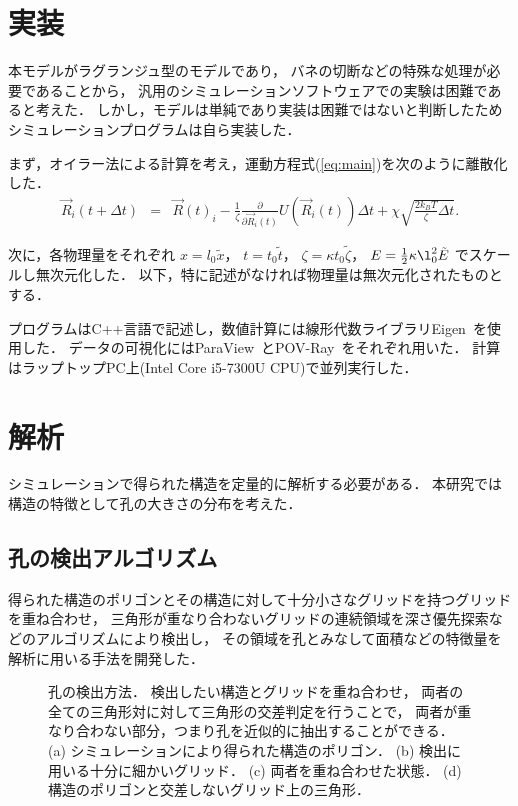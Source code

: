 


\section{実装}
本モデルがラグランジュ型のモデルであり，
バネの切断などの特殊な処理が必要であることから，
汎用のシミュレーションソフトウェアでの実験は困難であると考えた．
しかし，モデルは単純であり実装は困難ではないと判断したためシミュレーションプログラムは自ら実装した．

まず，オイラー法による計算を考え，運動方程式(\ref{eq:main})を次のように離散化した．
\begin{eqnarray}
    \vec{R}_i(t+\Delta t) &=& 
    \vec{R}(t)_i
    -\frac{1}{\zeta}\frac{\partial}{\partial\vec{R}_i(t)}U(\vec{R}_i(t))\Delta t
    +\chi\sqrt{\frac{2k_B T}{\zeta}\Delta t}
    .
\end{eqnarray}

次に，各物理量をそれぞれ
$x=l_0 \tilde{x}$，
$t=t_0 \tilde{t}$，
$\zeta=\kappa t_0 \tilde{\zeta}$，
$E=\frac{1}{2}\kappa\l_0^2\tilde{E}$
でスケールし無次元化した．
以下，特に記述がなければ物理量は無次元化されたものとする．


プログラムはC++言語で記述し，数値計算には線形代数ライブラリEigen~\cite{eigenweb}を使用した．
データの可視化にはParaView~\cite{paraview}とPOV-Ray~\cite{povray}をそれぞれ用いた．
計算はラップトップPC上(Intel Core i5-7300U CPU)で並列実行した．


\section{解析}
シミュレーションで得られた構造を定量的に解析する必要がある．
本研究では構造の特徴として孔の大きさの分布を考えた．

\subsection{孔の検出アルゴリズム}

得られた構造のポリゴンとその構造に対して十分小さなグリッドを持つグリッドを重ね合わせ，
三角形が重なり合わないグリッドの連続領域を深さ優先探索などのアルゴリズムにより検出し，
その領域を孔とみなして面積などの特徴量を解析に用いる手法を開発した．


\begin{figure}
\centering

\caption{
    孔の検出方法．
    検出したい構造とグリッドを重ね合わせ，
    両者の全ての三角形対に対して三角形の交差判定を行うことで，
    両者が重なり合わない部分，つまり孔を近似的に抽出することができる．
    (a) シミュレーションにより得られた構造のポリゴン．
    (b) 検出に用いる十分に細かいグリッド．
    (c) 両者を重ね合わせた状態．
    (d) 構造のポリゴンと交差しないグリッド上の三角形．
}
\label{fig:xor}
\end{figure}


